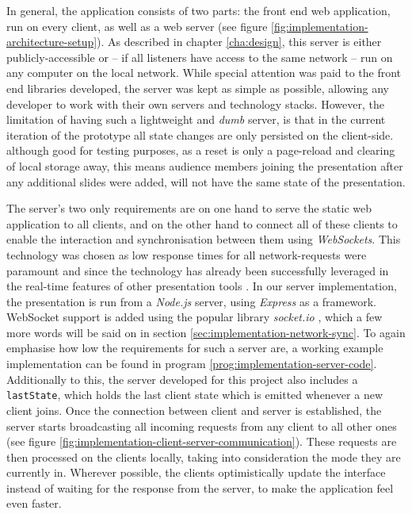 In general, the application consists of two parts: the front end web application, run on every client, as well as a web server (see figure \ref{fig:implementation-architecture-setup}). As described in chapter \ref{cha:design}, this server is either publicly-accessible or -- if all listeners have access to the same network -- run on any computer on the local network. While special attention was paid to the front end libraries developed, the server was kept as simple as possible, allowing any developer to work with their own servers and technology stacks. However, the limitation of having such a lightweight and \emph{dumb} server, is that in the current iteration of the prototype all state changes are only persisted on the client-side. although good for testing purposes, as a reset is only a page-reload and clearing of local storage away, this means audience members joining the presentation after any additional slides were added, will not have the same state of the presentation.

The server's two only requirements are on one hand to serve the static web application to all clients, and on the other hand to connect all of these clients to enable the interaction and synchronisation between them using \emph{WebSockets}. This technology was chosen as low response times for all network-requests were paramount and since the technology has already been successfully leveraged in the real-time features of other presentation tools \cite{Inoue:RealTimeQuestionnaire, Triglianos:InteractiveWebPresentationsImpress}. In our server implementation, the presentation is run from a \emph{Node.js} \cite{nodejs} server, using \emph{Express}\cite{express} as a framework. WebSocket support is added using the popular library \emph{socket.io} \cite{socketio}, which a few more words will be said on in section \ref{sec:implementation-network-sync}.
To again emphasise how low the requirements for such a server are, a working example implementation can be found in program \ref{prog:implementation-server-code}. Additionally to this, the server developed for this project also includes a \texttt{lastState}, which holds the last client state which is emitted whenever a new client joins. Once the connection between client and server is established, the server starts broadcasting all incoming requests from any client to all other ones (see figure \ref{fig:implementation-client-server-communication}). These requests are then processed on the clients locally, taking into consideration the mode they are currently in. Wherever possible, the clients optimistically update the interface instead of waiting for the response from the server, to make the application feel even faster.

